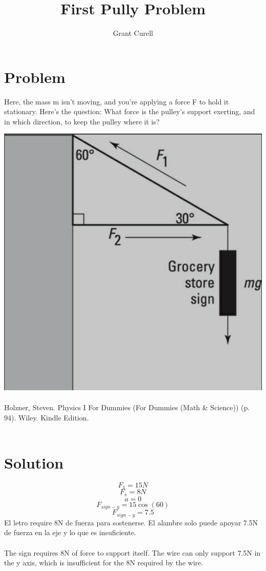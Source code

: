 \documentclass{article}
\title{First Pully Problem}
\author{Grant Curell}
\begin{document}
\maketitle{}
\section{Problem}
Here, the mass m isn’t moving, and you’re applying a force F to hold it stationary. Here’s the question: What force is the pulley’s support exerting, and in which direction, to keep the pulley where it is?

\includegraphics[width=\columnwidth]{image}
\\\\
Holzner, Steven. Physics I For Dummies (For Dummies (Math \& Science)) (p. 94). Wiley. Kindle Edition.
\\\\
\section{Solution}
\[ F_1=15N \]
\[ F_s=8N \]
\[ a=0 \]
\[ F_{sign-y}=15\cos(60) \]
\[ F_{sign-y}=7.5 \]
El letro require 8N de fuerza para sostenerse. El alambre solo puede apoyar 7.5N de fuerza en la eje y lo que es insuficiente.
\\\\
The sign requires 8N of force to support itself. The wire can only support 7.5N in the y axis, which is insufficient for the 8N required by the wire.
\end{document}
